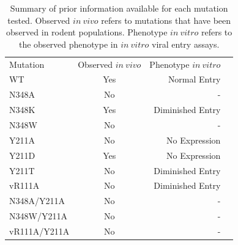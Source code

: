 \documentclass[journal=jacsat,manuscript=article]{achemso}
\begin{document}
\clearpage
\begin {table}[H]
\caption{\label{tab:summary_mutants}Summary of prior information available for each mutation tested. Observed $in~vivo$ refers to mutations that have been observed in rodent populations. Phenotype $in~vitro$ refers to the observed phenotype in $in~vitro$ viral entry assays.} 
\begin{center}
  \resizebox{11cm}{!} {
    \begin{tabular}{l c r r}
    \hline
      Mutation & Observed $in~vivo$ & Phenotype $in~vitro$ \\
            WT &                Yes &         Normal Entry \\
         N348A &                 No &                    - \\
         N348K &                Yes &     Diminished Entry \\
         N348W &                 No &                    - \\
         Y211A &                 No &        No Expression \\
         Y211D &                Yes &        No Expression \\
         Y211T &                 No &     Diminished Entry \\
        vR111A &                 No &     Diminished Entry \\
   N348A/Y211A &                 No &                    - \\
   N348W/Y211A &                 No &                    - \\
  vR111A/Y211A &                 No &                    - \\
    \hline
    \end{tabular}
  }
\end{center}
\end{table}
\end{document}
